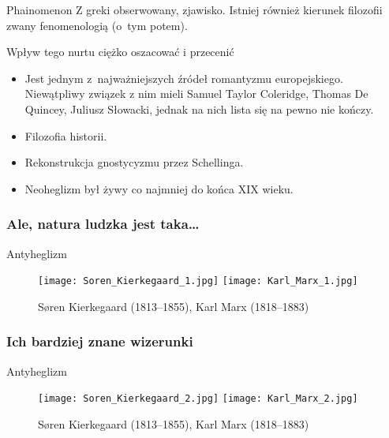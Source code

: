 \documentclass{beamer}  %
\begin{document}
\begin{frame}
  \begin{block}{Phainomenon}
    Z greki obserwowany, zjawisko. Istniej również kierunek filozofii
    zwany fenomenologią (o~tym potem).
  \end{block}
  \pause

  \begin{block}{Wpływ tego nurtu ciężko oszacować i przecenić}
    \begin{itemize}
    \item Jest jednym z~najważniejszych źródeł romantyzmu
      europejskiego. Niewątpliwy związek z nim mieli Samuel Taylor
      Coleridge, Thomas De Quincey, Juliusz Słowacki, jednak na nich
      lista się na pewno nie kończy.
    \item Filozofia historii.
    \item Rekonstrukcja gnostycyzmu przez Schellinga.
    \item Neoheglizm był żywy co najmniej do końca XIX wieku.
    \end{itemize}
  \end{block}

\end{frame}



\begin{frame}
  \frametitle{Ale, natura ludzka jest taka\ldots}
  \pause

  \begin{block}{Antyheglizm}
    \begin{figure}
      \centering

      \texttt{[image: Soren\_Kierkegaard\_1.jpg]}
      \texttt{[image: Karl\_Marx\_1.jpg]}
      \pause
      \caption{Søren Kierkegaard (1813--1855), Karl Marx (1818--1883)}
    \end{figure}
  \end{block}

\end{frame}



\begin{frame}
  \frametitle{Ich bardziej znane wizerunki}

  \begin{block}{Antyheglizm}
    \begin{figure}
      \centering

      \texttt{[image: Soren\_Kierkegaard\_2.jpg]}
      \texttt{[image: Karl\_Marx\_2.jpg]}
      \caption{Søren Kierkegaard (1813--1855), Karl Marx (1818--1883)}
    \end{figure}
  \end{block}

\end{frame}
\end{document}
